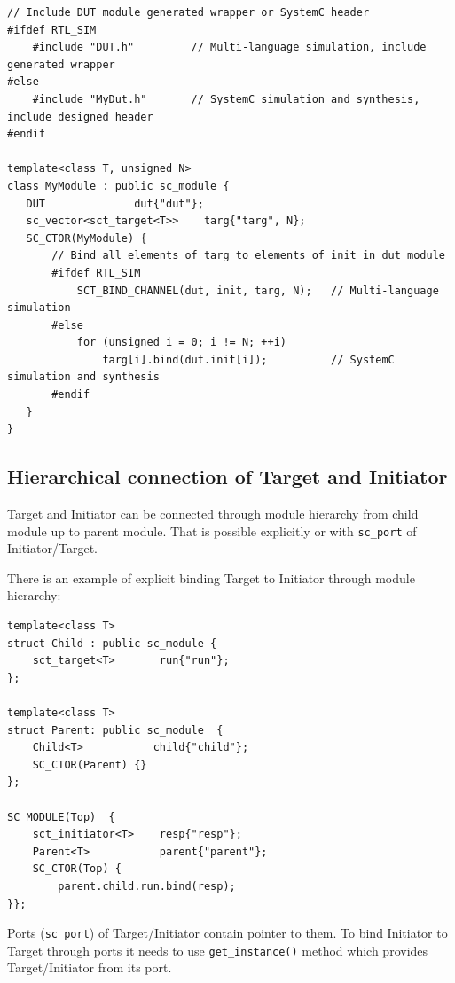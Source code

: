 \begin{lstlisting}[style=mycpp]
// Include DUT module generated wrapper or SystemC header 
#ifdef RTL_SIM
    #include "DUT.h"         // Multi-language simulation, include generated wrapper
#else 
    #include "MyDut.h"       // SystemC simulation and synthesis, include designed header
#endif

template<class T, unsigned N>
class MyModule : public sc_module {
   DUT              dut{"dut"}; 
   sc_vector<sct_target<T>>    targ{"targ", N};
   SC_CTOR(MyModule) {
       // Bind all elements of targ to elements of init in dut module 
       #ifdef RTL_SIM
           SCT_BIND_CHANNEL(dut, init, targ, N);   // Multi-language simulation
       #else 
           for (unsigned i = 0; i != N; ++i)  
               targ[i].bind(dut.init[i]);          // SystemC simulation and synthesis
       #endif
   }
}
\end{lstlisting}

\subsection{Hierarchical connection of Target and Initiator}

Target and Initiator can be connected through module hierarchy from child module up to parent module. That is possible explicitly or with {\tt sc\_port} of  Initiator/Target. 

There is an example of explicit binding Target to Initiator through module hierarchy:

\begin{lstlisting}[style=mycpp]
template<class T>
struct Child : public sc_module {
    sct_target<T>       run{"run"};
};

template<class T>
struct Parent: public sc_module  {
    Child<T>           child{"child"};
    SC_CTOR(Parent) {}
};

SC_MODULE(Top)  {
    sct_initiator<T>    resp{"resp"};
    Parent<T>           parent{"parent"};
    SC_CTOR(Top) {
        parent.child.run.bind(resp);
}};
\end{lstlisting}


Ports ({\tt sc\_port}) of Target/Initiator contain pointer to them. To bind Initiator to Target through ports it needs to use {\tt get\_instance()} method which provides Target/Initiator from its port.

